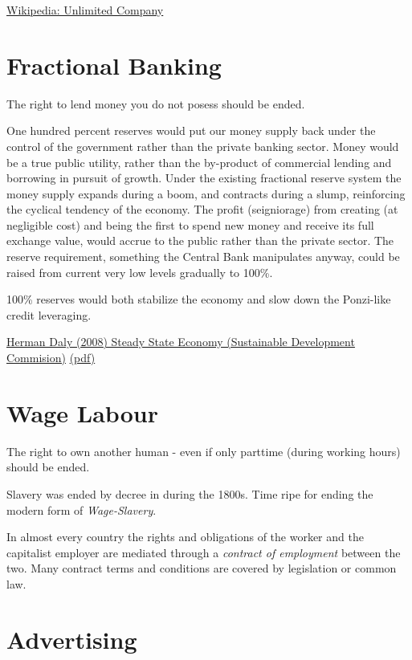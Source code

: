 \documentclass[
]{book}
\begin{document}
\href{https://en.wikipedia.org/wiki/Unlimited_company}{Wikipedia: Unlimited Company}

\hypertarget{fractional-banking}{%
\section{Fractional Banking}\label{fractional-banking}}

The right to lend money you do not posess should be ended.

One hundred percent reserves would put our money supply back under the control of the government rather than the
private banking sector. Money would be a true public utility, rather than the by-product of commercial lending and
borrowing in pursuit of growth. Under the existing fractional reserve system the money supply expands during a
boom, and contracts during a slump, reinforcing the cyclical tendency of the economy. The profit (seigniorage) from
creating (at negligible cost) and being the first to spend new money and receive its full exchange value, would accrue
to the public rather than the private sector. The reserve requirement, something the Central Bank manipulates anyway,
could be raised from current very low levels gradually to 100\%.

100\% reserves would both stabilize the economy and slow down the Ponzi-like
credit leveraging.

\href{http://\%20www.sd-commission.org.uk/publications.php@id=775.html}{Herman Daly (2008) Steady State Economy (Sustainable Development Commision)}
\href{pdf/Daly_2008_Steady_State_Economy_SD_Commision.pdf}{(pdf)}

\hypertarget{wage-labour-1}{%
\section{Wage Labour}\label{wage-labour-1}}

The right to own another human - even if only parttime (during working hours) should be ended.

Slavery was ended by decree in during the 1800s.
Time ripe for ending the modern form of \emph{Wage-Slavery}.

In almost every country the rights and obligations of the worker and the capitalist employer
are mediated through a \emph{contract of employment} between the two.
Many contract terms and conditions are covered by legislation or common law.

\hypertarget{advertising-1}{%
\section{Advertising}\label{advertising-1}}
\end{document}
